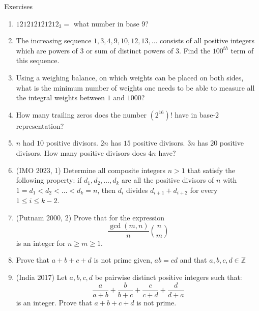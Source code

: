 \begin{xcb}{Exercises}
\begin{enumerate}
\item $121212121212_3 =$  what number in base 9?
\item The increasing sequence $1, 3, 4, 9, 10, 12, 13, \dots$ consists of all positive integers which are powers of $3$ or sum of distinct powers of $3$. Find the $100^{th}$ term of this sequence.
\item Using a weighing balance, on which weights can be placed on both sides, what is the minimum number of weights one needs to be able to measure all the integral weights between $1$ and $1000$?
\item How many trailing zeros does the number $(2^{16})!$ have in base-$2$ representation?
\item $n$ had $10$ positive divisors. $2n$ has $15$ positive divisors. $3n$ has $20$ positive divisors. How many positive divisors does $4n$ have?
\item(IMO 2023, 1) Determine all composite integers $n>1$ that satisfy the following property: if $d_1,d_2,\dots,d_k$ are all the positive divisors of $n$ with $1=d_1<d_2<\dots<d_k=n$, then $d_i$ divides $d_{i+1}+d_{i+2}$ for every $1\le i \le k-2$.
\item (Putnam 2000, 2) Prove that for the expression \[\frac{\gcd(m,n)}{n}\binom{n}{m}\] is an integer for $n \geq m \geq 1$.\\
\item Prove that $a+b+c+d$ is not prime given, $ab=cd$ and that $a,b,c,d \in \mathbb{Z}$
\item (India 2017) Let $a, b, c, d$ be pairwise distinct positive integers such that:\[\frac{a}{a+b}+\frac{b}{b+c}+\frac{c}{c+d}+\frac{d}{d+a}\] is an integer. Prove that $a+b+c+d$ is not prime.\\
\end{enumerate}
\end{xcb}